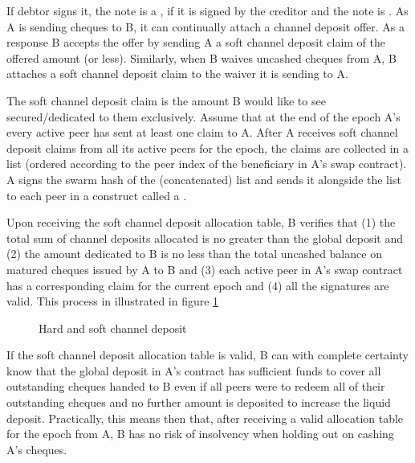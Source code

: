 If debtor signs it, the note is a , if it is signed by the creditor and the note is . As A is sending cheques to B, it can continually attach a channel deposit offer. As a response B accepts the offer by sending A a soft channel deposit claim of the offered amount (or less). Similarly, when B waives uncashed cheques from A, B attaches a soft channel deposit claim to the waiver it is sending to A.

The soft channel deposit claim is the amount B would like to see secured/dedicated to them exclusively.
Assume that at the end of the epoch A's every  active peer has sent at least one claim to A.
After A receives soft channel deposit claims from all its active peers for the epoch, the claims are
collected in a list (ordered according to the peer index of the beneficiary in A's swap contract).
A signs the swarm hash of the (concatenated) list and sends it alongside the list to each peer
in a construct called a .

Upon receiving the soft channel deposit allocation table, B verifies that
(1) the total sum of channel deposits allocated is no greater than the global deposit and
(2) the amount dedicated to B is no less than the total uncashed balance on matured cheques issued by A to B and
(3) each active peer in A's swap contract has a corresponding claim for the current epoch and 
(4) all the signatures are valid.
This process in illustrated in figure \ref{fig:softchanneldeposit}


\begin{center}
\begin{figure}
\begin{center}
\begin{tikzpicture}
\end{tikzpicture}
\end{center}
\caption{Hard and soft channel deposit}
\label{fig:softchanneldeposit}
\end{figure}
\end{center}


If the soft channel deposit allocation table is valid, B can with complete certainty know that the global deposit in A's contract has sufficient funds to cover all outstanding cheques handed to B even if all peers were to redeem all of their outstanding cheques and no further amount is deposited to increase the liquid deposit.
Practically, this means then that, after receiving a valid allocation table for the epoch from A, B has no risk of insolvency when holding out on cashing A's cheques. 

